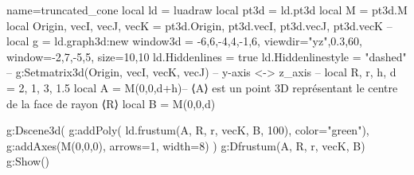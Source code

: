 \documentclass{standalone}
\begin{document}
 \begin{luadraw}{name=truncated_cone}
  local ld = luadraw 
 local pt3d = ld.pt3d
 local M = pt3d.M
 local Origin, vecI, vecJ, vecK = pt3d.Origin, pt3d.vecI, pt3d.vecJ, pt3d.vecK
 --
 local g = ld.graph3d:new{
    window3d = {-6,6,-4,4,-1,6},
    viewdir={"yz",0.3,60},
    window={-2,7,-5,5}, 
    size={10,10}
 }
 ld.Hiddenlines = true
 ld.Hiddenlinestyle = "dashed"
 --
 g:Setmatrix3d({Origin, vecI, vecK, vecJ}) -- y-axis <-> z_axis
 --
 local R, r, h, d = 2, 1, 3, 1.5
 local A = M(0,0,d+h)-- ⟨A⟩ est un point 3D représentant le centre de la face de rayon ⟨R⟩
 local B = M(0,0,d)

g:Dscene3d(
    g:addPoly( ld.frustum(A, R, r, vecK, B, 100), {color="green"}),
    g:addAxes(M(0,0,0), {arrows=1, width=8})
    )
 g:Dfrustum(A, R, r, vecK, B)
  g:Show()
 \end{luadraw}
 
\end{document}
